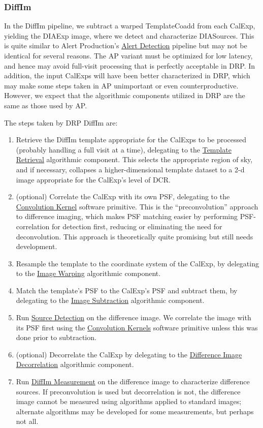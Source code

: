 \subsubsection{DiffIm}
\label{sec:drpDiffIm}

In the DiffIm pipeline, we subtract a warped TemplateCoadd from each CalExp, yielding the DIAExp image, where we detect and characterize DIASources.  This is quite similar to Alert Production's \hyperref[sec:apAlertDetection]{Alert Detection} pipeline but may not be identical for several reasons.  The AP variant must be optimized for low latency, and hence may avoid full-visit processing that is perfectly acceptable in DRP.  In addition, the input CalExps will have been better characterized in DRP, which may make some steps taken in AP unimportant or even counterproductive.  However, we expect that the algorithmic components utilized in DRP are the same as those used by AP.

The steps taken by DRP DiffIm are:
\begin{enumerate}
\item Retrieve the DiffIm template appropriate for the CalExps to be processed (probably handling a full visit at a time), delegating to the \hyperref[sec:acRetrieveTemplate]{Template Retrieval} algorithmic component.  This selects the appropriate region of sky, and if necessary, collapses a higher-dimensional template dataset to a 2-d image appropriate for the CalExp's level of DCR.
\item (optional) Correlate the CalExp with its own PSF, delegating to the \hyperref[sec:spKernels]{Convolution Kernel} software primitive.  This is the ``preconvolution'' approach to difference imaging, which makes PSF matching easier by performing PSF-correlation for detection first, reducing or eliminating the need for deconvolution.  This approach is theoretically quite promising but still needs development.
\item Resample the template to the coordinate system of the CalExp, by delegating to the \hyperref[sec:acWarping]{Image Warping} algorithmic component.
\item Match the template's PSF to the CalExp's PSF and subtract them, by delegating to the \hyperref[sec:acImageSubtraction]{Image Subtraction} algorithmic component.
\item Run \hyperref[sec:acSourceDetection]{Source Detection} on the difference image.  We correlate the image with its PSF first using the \hyperref[sec:spKernels]{Convolution Kernels} software primitive unless this was done prior to subtraction.
\item (optional) Decorrelate the CalExp by delegating to the \hyperref[sec:acDiffImDecorrelation]{Difference Image Decorrelation} algorithmic component.
\item Run \hyperref[sec:acDiffImMeasurement]{DiffIm Measurement} on the difference image to characterize difference sources.  If preconvolution is used but decorrelation is not, the difference image cannot be measured using algorithms applied to standard images; alternate algorithms may be developed for some measurements, but perhaps not all.
\end{enumerate}

